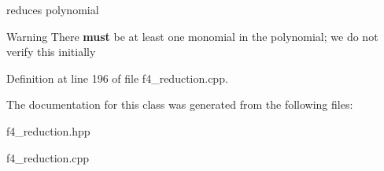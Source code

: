 reduces polynomial 

\begin{DoxyWarning}{Warning}
There {\bfseries must} be at least one monomial in the polynomial; we do not verify this initially 
\end{DoxyWarning}


Definition at line 196 of file f4\+\_\+reduction.\+cpp.



The documentation for this class was generated from the following files\+:\begin{DoxyCompactItemize}
\item 
f4\+\_\+reduction.\+hpp\item 
f4\+\_\+reduction.\+cpp\end{DoxyCompactItemize}
